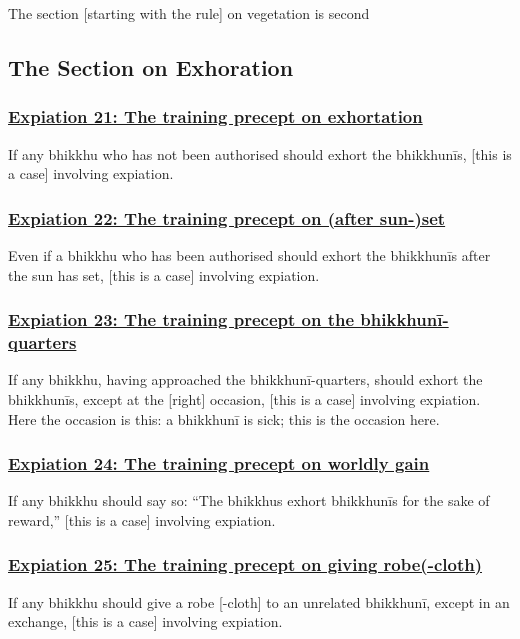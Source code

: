 \begin{center}
  The section [starting with the rule] on vegetation is second
\end{center}

\setsubsecheadstyle{\subsectionFmt}
\subsection{The Section on Exhoration}
\vspace{0.2cm}

\subsubsection*{\hyperref[pac21]{Expiation 21: The training precept on exhortation}}
\label{exp21}
If any bhikkhu who has not been authorised should exhort the bhikkhunīs, [this is a case] involving expiation.

\subsubsection*{\hyperref[pac22]{Expiation 22: The training precept on (after sun-)set}}
\label{exp22}
Even if a bhikkhu who has been authorised should exhort the bhikkhunīs after the sun has set, [this is a case] involving expiation.

\subsubsection*{\hyperref[pac23]{Expiation 23: The training precept on the bhikkhunī-quarters}}
\label{exp23}
If any bhikkhu, having approached the bhikkhunī-quarters, should exhort the bhikkhunīs, except at the [right] occasion, [this is a case] involving expiation. Here the occasion is this: a bhikkhunī is sick; this is the occasion here.

\subsubsection*{\hyperref[pac24]{Expiation 24: The training precept on worldly gain}}
\label{exp24}
If any bhikkhu should say so: ``The bhikkhus exhort bhikkhunīs for the sake of reward,'' [this is a case] involving expiation.

\subsubsection*{\hyperref[pac25]{Expiation 25: The training precept on giving robe(-cloth)}}
\label{exp25}
If any bhikkhu should give a robe [-cloth] to an unrelated bhikkhunī, except in an exchange, [this is a case] involving expiation.

